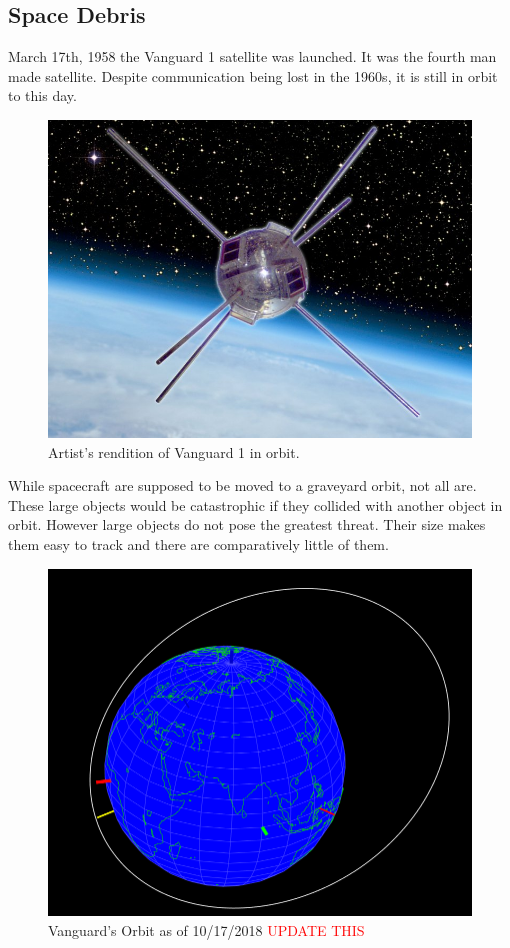 \documentclass[12pt]{article}
\begin{document}
	\subsection{Space Debris}
	
	March 17th, 1958 the Vanguard 1 satellite was launched. It was the fourth man made satellite. Despite communication being lost in the 1960s, it is still in orbit to this day. \par 
	
	\begin{figure}[h!]
		\centering
		\includegraphics[width=0.7\linewidth]{Vanguard_1_composite}
		\caption{Artist's rendition of Vanguard 1 in orbit\cite{usnrl_2008}.}
		\label{fig:vanguard1composite}
	\end{figure}
	
	While spacecraft are supposed to be moved to a graveyard orbit, not all are. These large objects would be catastrophic if they collided with another object in orbit. However large objects do not pose the greatest threat. Their size makes them easy to track and there are comparatively little of them. 
	
	\begin{figure}
		\centering
		\includegraphics[width=0.7\linewidth]{Vanguard_1_orbit}
		\caption{Vanguard's Orbit as of 10/17/2018 \textcolor{red}{UPDATE THIS}}
		\label{fig:vanguard1orbit}
	\end{figure}
\end{document}
